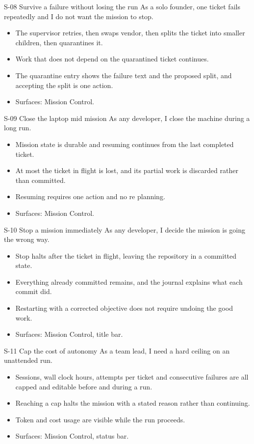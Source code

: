 \begin{story}{S-08 \quad Survive a failure without losing the run}
As a solo founder, one ticket fails repeatedly and I do not want the mission to stop.
\end{story}
\begin{itemize}
  \item The supervisor retries, then swaps vendor, then splits the ticket into smaller
  children, then quarantines it.
  \item Work that does not depend on the quarantined ticket continues.
  \item The quarantine entry shows the failure text and the proposed split, and accepting the
  split is one action.
  \item Surfaces: Mission Control.
\end{itemize}

\begin{story}{S-09 \quad Close the laptop mid mission}
As any developer, I close the machine during a long run.
\end{story}
\begin{itemize}
  \item Mission state is durable and resuming continues from the last completed ticket.
  \item At most the ticket in flight is lost, and its partial work is discarded rather than
  committed.
  \item Resuming requires one action and no re planning.
  \item Surfaces: Mission Control.
\end{itemize}

\begin{story}{S-10 \quad Stop a mission immediately}
As any developer, I decide the mission is going the wrong way.
\end{story}
\begin{itemize}
  \item Stop halts after the ticket in flight, leaving the repository in a committed state.
  \item Everything already committed remains, and the journal explains what each commit did.
  \item Restarting with a corrected objective does not require undoing the good work.
  \item Surfaces: Mission Control, title bar.
\end{itemize}

\begin{story}{S-11 \quad Cap the cost of autonomy}
As a team lead, I need a hard ceiling on an unattended run.
\end{story}
\begin{itemize}
  \item Sessions, wall clock hours, attempts per ticket and consecutive failures are all
  capped and editable before and during a run.
  \item Reaching a cap halts the mission with a stated reason rather than continuing.
  \item Token and cost usage are visible while the run proceeds.
  \item Surfaces: Mission Control, status bar.
\end{itemize}

